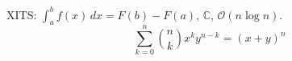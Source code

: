 \documentclass{article}
\begin{document}
XITS: $\int_a^b f(x)\,dx = F(b) - F(a)$, $\mathbb{C}$, $\mathcal{O}(n\log n)$.
\[ \sum_{k=0}^n \binom{n}{k} x^k y^{n-k} = (x+y)^n \]
\end{document}
